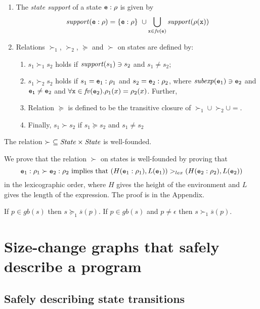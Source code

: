 \documentclass{LMCS}
\newcommand{\be}{\begin{enumerate}}
\newcommand{\ee}{\end{enumerate}}
\newcommand{\bdfn}{\begin{defi}}
\newcommand{\edfn}{\end{defi}}
\newcommand{\blem}{\begin{lem}}
\newcommand{\elem}{\end{lem}}
\theoremstyle{definition}\newtheorem{env}[thm]{Environment}
\begin{document}
\bdfn\label{def-value-decrease}\hfill

\be[(1)]

\item 
The {\em state support}  of 
a state ${\tt e}:\rho$ is given by
\[
{\it support}({\tt e}:\rho) = \{{\tt e}:\rho\}\  \cup 
 \bigcup_{{\tt x}\in{\it fv}({\tt e})}
     {\it support}(\rho({\tt x}))
     \]

\item Relations  
$\succ_1$, $\succ_2$, $\succeq$ and $\succ$ on states are defined by:
\be[$\bullet$]

\item  $s_1\succ_1 s_2$ holds if ${\it support}(s_1)\ni s_2$ and $s_1 \neq s_2$; 

\item $s_1\succ_2 s_2$ holds if $s_1={\tt e}_1:\rho_1$ and 
$s_2={\tt e}_2:\rho_2$, where 
$ {\it subexp}({\tt e}_1) \ni {\tt e}_2$ and ${\tt e_1}\neq {\tt e}_2$ and $\forall {\tt x}\in{\it fv}({\tt e}_2).\rho_1(x)=\rho_2(x)$. Further, \\


\item Relation  $\succeq$ is defined to be the transitive closure of 
$\succ_1\cup \succ_2\cup =$. 

\item Finally, $s_1 \succ s_2$ if $s_1\succeq s_2$ and $s_1\neq s_2$\\
\ee
\ee
\edfn

\blem\label{lem-well-founded}
The relation $\succ\ \subseteq{\it State}\times{\it State}$ is 
well-founded.
\elem

We prove that the relation $\succ$ on states is well-founded
by proving that 
$${\tt e}_1:\rho_1 \succ {\tt e}_2:\rho_2 \mbox{ implies  
that } (H({\tt e}_1:\rho_1),L({\tt e}_1)) >_{lex} (H({\tt e}_2:\rho_2),L({\tt e}_2))$$
in the lexicographic order, where $H$ gives the height of the environment and $L$ gives the length of the expression. 
 The proof is in the Appendix.



\blem\label{lem-sub-env}
If $p\in gb(s)$ then $s \succeq_1 \overline{s}(p)$. 
If $p\in gb(s)$ and $p\neq \epsilon$ then $s \succ_1 \overline{s}(p)$.
\elem


\section{Size-change graphs that safely describe a program}


\subsection{Safely describing state transitions}
\end{document}
